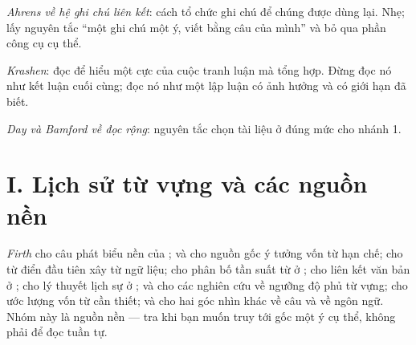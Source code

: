\documentclass[english.tex]{subfiles}
\begin{document}
\emph{Ahrens về hệ ghi chú liên kết}\cite{ahrens2017}: cách tổ chức ghi chú để chúng được dùng lại. Nhẹ; lấy nguyên tắc ``một ghi chú một ý, viết bằng câu của mình'' và bỏ qua phần công cụ cụ thể.

\emph{Krashen}\cite{krashen1985}: đọc để hiểu một cực của cuộc tranh luận mà  tổng hợp. Đừng đọc nó như kết luận cuối cùng; đọc nó như một lập luận có ảnh hưởng và có giới hạn đã biết.

\emph{Day và Bamford về đọc rộng}\cite{daybamford1998}: nguyên tắc chọn tài liệu ở đúng mức cho nhánh 1.

\section*{I. Lịch sử từ vựng và các nguồn nền}

\emph{Firth}\cite{firth1957} cho câu phát biểu nền của ;\cite{ogden1923} và\cite{west1953} cho nguồn gốc ý tưởng vốn từ hạn chế;\cite{cobuild1987} cho từ điển đầu tiên xây từ ngữ liệu;\cite{zipf1949} cho phân bố tần suất từ ở ;\cite{halliday1976} cho liên kết văn bản ở ;\cite{brownlevinson1987} cho lý thuyết lịch sự ở ;\cite{hunation2000} và\cite{laufer2010} cho các nghiên cứu về ngưỡng độ phủ từ vựng;\cite{nation2006} cho ước lượng vốn từ cần thiết;\cite{fish2011} và\cite{lewis1949} cho hai góc nhìn khác về câu và về ngôn ngữ. Nhóm này là nguồn nền --- tra khi bạn muốn truy tới gốc một ý cụ thể, không phải để đọc tuần tự.
\end{document}

